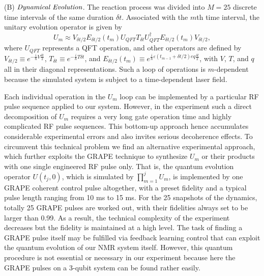 \documentclass[prl,twocolumn,showpacs]{revtex4}
\begin{document}
(B) $\emph{Dynamical Evolution}$. The reaction process was divided into $M=25$ discrete time intervals of the same duration $\delta t$.
Associated with the $m$th time interval, the unitary evolution operator is given by
\begin{equation}
U_m\approx V_{\delta t/2}{E}_{\delta t/2}(t_m)U_{QFT}T_{\delta t}U_{QFT}^{\dagger}{E}_{\delta t/2}(t_{m}){V}_{\delta t/2},
\end{equation}
where $U_{QFT}$ represents a QFT operation, and other operators are defined by ${V}_{\delta t/2}\equiv e^{-\frac{i}{\hbar}{V}\frac{\delta t}{2}}$, ${T}_{\delta t} \equiv e^{-\frac{i}{\hbar}{T}\delta t}$, and ${E}_{\delta t/2}(t_m)\equiv e^{\frac{i}{\hbar}\varepsilon(t_{m-1}+\delta t/2) e q\frac{\delta t}{2}}$, with $V$, $T$, and $q$ all in their diagonal representations.  Such a loop of operations is $m$-dependent because the simulated system is subject to a time-dependent laser field.

Each individual operation in the $U_m$ loop  can be implemented by a particular RF pulse sequence applied to our system. However, in the experiment such a direct decomposition of $U_m$ requires a very long gate operation time and highly complicated RF pulse sequences. This bottom-up approach hence accumulates considerable experimental errors and
also invites serious decoherence effects. To circumvent this technical problem we find an alternative experimental approach, which further
exploits the GRAPE technique to synthesize $U_m$ or their products with one single engineered RF pulse only. That is, the quantum evolution operator $U(t_j, 0)$, which is simulated by $\prod_{m=1}^{j}U_m$, is implemented by one GRAPE coherent control pulse altogether, with a preset fidelity and a typical pulse length ranging from 10 ms to 15 ms.  For the 25 snapshots of the dynamics, totally 25 GRAPE pulses are worked out, with their fidelities always set to be larger than 0.99.  As a result, the technical complexity of the experiment decreases but the fidelity is maintained at a high level.  The task of finding a GRAPE pulse itself may be fulfilled via feedback learning control \cite{rabitz} that can exploit the quantum evolution of our NMR system itself.  However, this quantum procedure is not essential or necessary in our experiment because here the GRAPE pulses on a 3-qubit system can be found rather easily.
\end{document}
